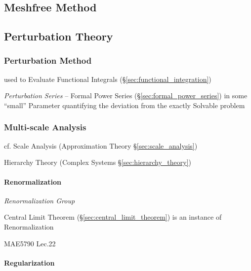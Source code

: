 \subsection{Meshfree Method}\label{sec:meshfree_method}

\subsection{Perturbation Theory}\label{sec:perturbation_theory}

\subsubsection{Perturbation Method}\label{sec:perturbation_method}

used to Evaluate Functional Integrals (\S\ref{sec:functional_integration})

\emph{Perturbation Series} -- Formal Power Series
(\S\ref{sec:formal_power_series}) in some ``small'' Parameter quantifying the
deviation from the exactly Solvable problem



\subsubsection{Multi-scale Analysis}\label{sec:multiscale_analysis}

cf. Scale Analysis (Approximation Theory \S\ref{sec:scale_analysis})

\fist Hierarchy Theory (Complex Systems \S\ref{sec:hierarchy_theory})



\paragraph{Renormalization}\label{sec:renormalization}\hfill

\emph{Renormalization Group}

\fist Central Limit Theorem (\S\ref{sec:central_limit_theorem}) is an instance
of Renormalization

MAE5790 Lec.22



\paragraph{Regularization}\label{sec:regularization}\hfill



